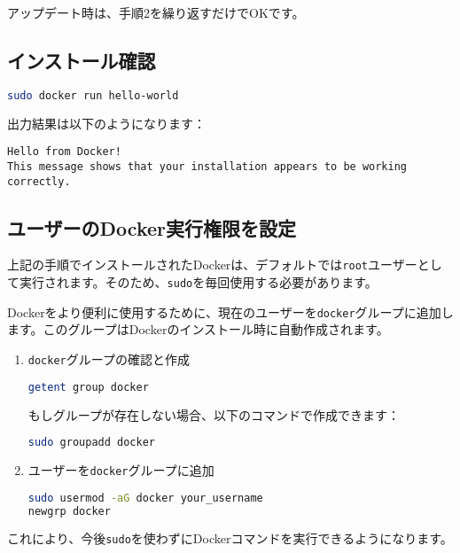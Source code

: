 アップデート時は、手順2を繰り返すだけでOKです。

\subsection{インストール確認}
\begin{lstlisting}[language=bash]
sudo docker run hello-world
\end{lstlisting}

出力結果は以下のようになります：
\begin{lstlisting}
Hello from Docker!
This message shows that your installation appears to be working correctly.
\end{lstlisting}

\subsection{ユーザーのDocker実行権限を設定}
上記の手順でインストールされたDockerは、デフォルトでは\texttt{root}ユーザーとして実行されます。そのため、\texttt{sudo}を毎回使用する必要があります。

Dockerをより便利に使用するために、現在のユーザーを\texttt{docker}グループに追加します。このグループはDockerのインストール時に自動作成されます。

\begin{enumerate}
    \item \texttt{docker}グループの確認と作成
\begin{lstlisting}[language=bash]
getent group docker
\end{lstlisting}

もしグループが存在しない場合、以下のコマンドで作成できます：
\begin{lstlisting}[language=bash]
sudo groupadd docker
\end{lstlisting}

    \item ユーザーを\texttt{docker}グループに追加
\begin{lstlisting}[language=bash]
sudo usermod -aG docker your_username
newgrp docker
\end{lstlisting}

\end{enumerate}

これにより、今後\texttt{sudo}を使わずにDockerコマンドを実行できるようになります。